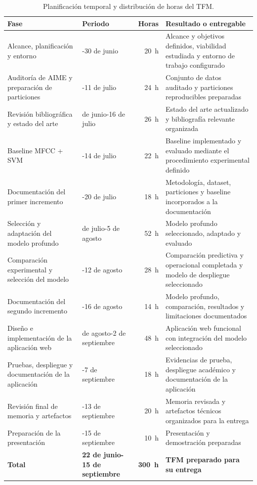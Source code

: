 \begin{table}[H]
    \centering
    \small
    \renewcommand{\arraystretch}{1.18}
    \begin{tabularx}{\textwidth}{>{\raggedright\arraybackslash}p{}>{\raggedright\arraybackslash}p{}r>{\raggedright\arraybackslash}X}
        \hline
        \textbf{Fase} & \textbf{Periodo} & \textbf{Horas} & \textbf{Resultado o entregable} \\
        \hline
        Alcance, planificación y entorno & 22-30 de junio & 20~h & Alcance y objetivos definidos, viabilidad estudiada y entorno de trabajo configurado \\
        Auditoría de AIME y preparación de particiones & 1-11 de julio & 24~h & Conjunto de datos auditado y particiones reproducibles preparadas \\
        Revisión bibliográfica y estado del arte & 22 de junio-16 de julio & 26~h & Estado del arte actualizado y bibliografía relevante organizada \\
        Baseline MFCC + SVM & 12-14 de julio & 22~h & Baseline implementado y evaluado mediante el procedimiento experimental definido \\
        Documentación del primer incremento & 15-20 de julio & 18~h & Metodología, dataset, particiones y baseline incorporados a la documentación \\
        Selección y adaptación del modelo profundo & 21 de julio-5 de agosto & 52~h & Modelo profundo seleccionado, adaptado y evaluado \\
        Comparación experimental y selección del modelo & 6-12 de agosto & 28~h & Comparación predictiva y operacional completada y modelo de despliegue seleccionado \\
        Documentación del segundo incremento & 13-16 de agosto & 14~h & Modelo profundo, comparación, resultados y limitaciones documentados \\
        Diseño e implementación de la aplicación web & 17 de agosto-2 de septiembre & 48~h & Aplicación web funcional con integración del modelo seleccionado \\
        Pruebas, despliegue y documentación de la aplicación & 3-7 de septiembre & 18~h & Evidencias de prueba, despliegue académico y documentación de la aplicación \\
        Revisión final de memoria y artefactos & 8-13 de septiembre & 20~h & Memoria revisada y artefactos técnicos organizados para la entrega \\
        Preparación de la presentación & 14-15 de septiembre & 10~h & Presentación y demostración preparadas \\
        \hline
        \textbf{Total} & \textbf{22 de junio-15 de septiembre} & \textbf{300~h} & \textbf{TFM preparado para su entrega} \\
        \hline
    \end{tabularx}
    \caption{Planificación temporal y distribución de horas del TFM.}
    \label{tab:planificacion-tfm}
\end{table}

